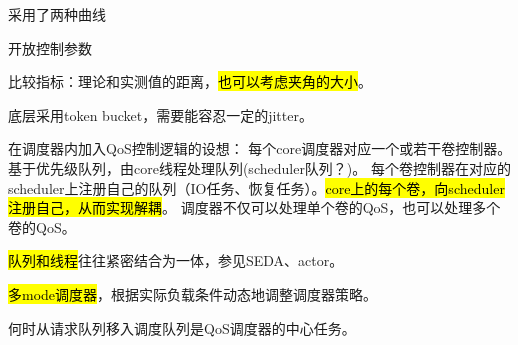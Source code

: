 采用了两种曲线

开放控制参数

比较指标：理论和实测值的距离，\hl{也可以考虑夹角的大小}。

底层采用token bucket，需要能容忍一定的jitter。

在调度器内加入QoS控制逻辑的设想： 每个core调度器对应一个或若干卷控制器。基于优先级队列，由core线程处理队列(scheduler队列？)。
每个卷控制器在对应的scheduler上注册自己的队列（IO任务、恢复任务）。\hl{core上的每个卷，向scheduler注册自己，从而实现解耦}。
调度器不仅可以处理单个卷的QoS，也可以处理多个卷的QoS。

\hl{队列和线程}往往紧密结合为一体，参见SEDA、actor。

\hl{多mode调度器}，根据实际负载条件动态地调整调度器策略。

何时从请求队列移入调度队列是QoS调度器的中心任务。

